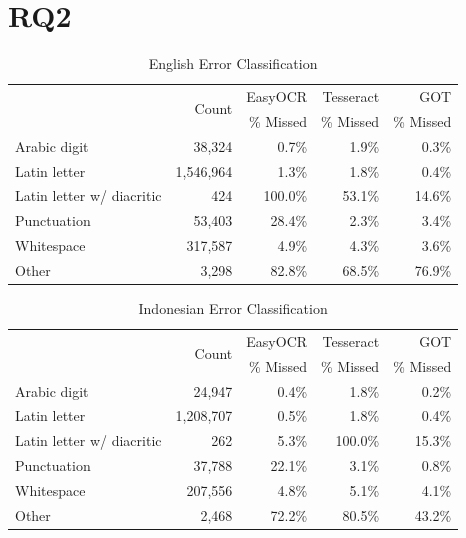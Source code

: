 \documentclass[12pt,oneside]{memoir}
\begin{document}
\section{RQ2}

\begin{table}[ht]
    \caption{English Error Classification}
    \label{table:english-error-classification}
    \centering
    \begin{tabular}{lrrrr}
        \toprule
        & \multirow{2}{*}{Count} & EasyOCR & Tesseract & GOT\\
        & & \% Missed & \% Missed & \% Missed\\
        \midrule
        Arabic digit & 38,324 & 0.7\% & 1.9\% & 0.3\%\\
        Latin letter & 1,546,964 & 1.3\% & 1.8\% & 0.4\%\\
        Latin letter w/ diacritic & 424 & 100.0\% & 53.1\% & 14.6\%\\
        Punctuation & 53,403 & 28.4\% & 2.3\% & 3.4\%\\
        Whitespace & 317,587 & 4.9\% & 4.3\% & 3.6\%\\
        Other & 3,298 & 82.8\% & 68.5\% & 76.9\%\\
        \bottomrule
    \end{tabular}
\end{table}

\begin{table}[ht]
    \caption{Indonesian Error Classification}
    \label{table:indonesian-error-classification}
    \centering
    \begin{tabular}{lrrrr}
        \toprule
        & \multirow{2}{*}{Count} & EasyOCR & Tesseract & GOT\\
        & & \% Missed & \% Missed & \% Missed\\
        \midrule
        Arabic digit & 24,947 & 0.4\% & 1.8\% & 0.2\%\\
        Latin letter & 1,208,707 & 0.5\% & 1.8\% & 0.4\%\\
        Latin letter w/ diacritic & 262 & 5.3\% & 100.0\% & 15.3\%\\
        Punctuation & 37,788 & 22.1\% & 3.1\% & 0.8\%\\
        Whitespace & 207,556 & 4.8\% & 5.1\% & 4.1\%\\
        Other & 2,468 & 72.2\% & 80.5\% & 43.2\%\\
        \bottomrule
    \end{tabular}
\end{table}
\end{document}
